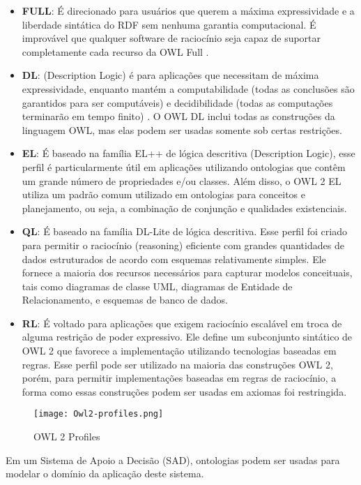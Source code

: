 \begin{itemize}
    \item \textbf{FULL}: É direcionado para usuários que querem a máxima expressividade e a liberdade sintática do RDF sem nenhuma garantia computacional. É improvável que qualquer software de raciocínio seja capaz de suportar completamente cada recurso da OWL Full \cite{McGuinness2004}.

    \item \textbf{DL}: (Description Logic) é para aplicações que necessitam de máxima expressividade, enquanto mantém a computabilidade (todas as conclusões são garantidos para ser computáveis) e decidibilidade (todas as computações terminarão em tempo finito) \cite{McGuinness2004}. O OWL DL inclui todas as construções da linguagem OWL, mas elas podem ser usadas somente sob certas restrições.

    \item \textbf{EL}: É baseado na família EL++ de lógica descritiva (Description Logic), esse perfil é particularmente útil em aplicações utilizando ontologias que contêm um grande número de propriedades e/ou classes. Além disso, o OWL 2 EL utiliza um padrão comum utilizado em ontologias para conceitos e planejamento, ou seja, a combinação de conjunção e qualidades existenciais.

    \item \textbf{QL}: É baseado na família DL-Lite de lógica descritiva. Esse perfil foi criado para permitir o raciocínio (reasoning) eficiente com grandes quantidades de dados estruturados de acordo com esquemas relativamente simples. Ele fornece a maioria dos recursos necessários para capturar modelos conceituais, tais como diagramas de classe UML, diagramas de Entidade de Relacionamento, e esquemas de banco de dados.
 
    \item \textbf{RL}: É voltado para aplicações que exigem raciocínio escalável em troca de alguma restrição de poder expressivo. Ele define um subconjunto sintático de OWL 2 que favorece a implementação utilizando tecnologias baseadas em regras. Esse perfil pode ser utilizado na maioria das construções OWL 2, porém, para permitir implementações baseadas em regras de raciocínio, a forma como essas construções podem ser usadas em axiomas foi restringida.

\end{itemize}

\begin{figure}
    \centering
    \texttt{[image: Owl2-profiles.png]}
    \caption{OWL 2 Profiles}
    \label{fig:OWLProfile}
\end{figure}

Em um Sistema de Apoio a Decisão (SAD), ontologias podem ser usadas para modelar o domínio da aplicação deste sistema.
